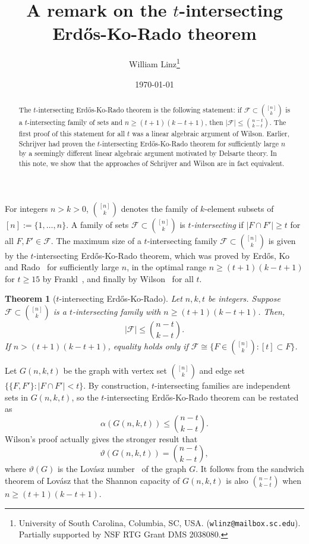 \documentclass[12pt]{article}
\title{A remark on the $t$-intersecting Erd\H{o}s-Ko-Rado theorem}
\author{William Linz\thanks{University of South Carolina, Columbia, SC, USA. ({\tt wlinz@mailbox.sc.edu}). Partially supported by NSF RTG Grant DMS 2038080.}}
\date{\today}
\newtheorem{theorem}{Theorem}
\theoremstyle{definition}
\theoremstyle{remark}
\newcommand{\cF}{\mathcal{F}}
\begin{document}
\maketitle


\begin{abstract}
The $t$-intersecting Erd\H{o}s-Ko-Rado theorem is the following statement: if $\mathcal{F} \subset \binom{[n]}{k}$ is a $t$-intersecting family of sets and $n\ge (t+1)(k-t+1)$, then $|\cF| \le \binom{n-t}{k-t}$. The first proof of this statement for all $t$ was a linear algebraic argument of Wilson. Earlier, Schrijver had proven the $t$-intersecting Erd\H{o}s-Ko-Rado theorem for sufficiently large $n$ by a seemingly different linear algebraic argument motivated by Delsarte theory. In this note, we show that the approaches of Schrijver and Wilson are in fact equivalent.
\end{abstract}


For integers $n > k > 0$, $\binom{[n]}{k}$ denotes the family of $k$-element subsets of $[n]:=\{1, \ldots, n\}$. A family of sets $\cF\subset \binom{[n]}{k}$ is \emph{$t$-intersecting} if $|F\cap F'| \ge t$ for all $F, F'\in \mathcal{F}$. The maximum size of a $t$-intersecting family $\mathcal{F} \subset \binom{[n]}{k}$ is given by the $t$-intersecting Erd\H{o}s-Ko-Rado theorem, which was proved by Erd\H{o}s, Ko and Rado~\cite{EKR} for sufficiently large $n$, in the optimal range $n\ge (t+1)(k-t+1)$ for $t\ge 15$ by Frankl~\cite{Frankl}, and finally by Wilson~\cite{Wil} for all $t$. 

\begin{theorem}[$t$-intersecting Erd\H{o}s-Ko-Rado]\label{thm:tintekrset}
Let $n, k, t$ be integers. Suppose $\cF\subset \binom{[n]}{k}$ is a $t$-intersecting family with $n\ge (t+1)(k-t+1)$. Then, 
\[|\cF| \le \binom{n-t}{k-t}.\]
If $n > (t+1)(k-t+1)$, equality holds only if $\cF\cong\{F\in \binom{[n]}{k}: [t] \subset F\}$. 
\end{theorem}

Let $G(n, k, t)$ be the graph with vertex set $\binom{[n]}{k}$ and edge set $\{\{F, F'\}: |F\cap F'| < t\}$. By construction, $t$-intersecting families are independent sets in $G(n, k, t)$, so the $t$-intersecting Erd\H{o}s-Ko-Rado theorem can be restated as 
\[\alpha(G(n, k, t)) \le \binom{n-t}{k-t}.\]
Wilson's proof actually gives the stronger result that 
\[\vartheta(G(n, k, t)) = \binom{n-t}{k-t},\]
where $\vartheta(G)$ is the Lov\'asz number~\cite{Lov} of the graph $G$. It follows from the sandwich theorem of Lov\'asz that the Shannon capacity of $G(n, k, t)$ is also $\binom{n-t}{k-t}$ when $n\ge (t+1)(k-t+1)$. 
\end{document}
